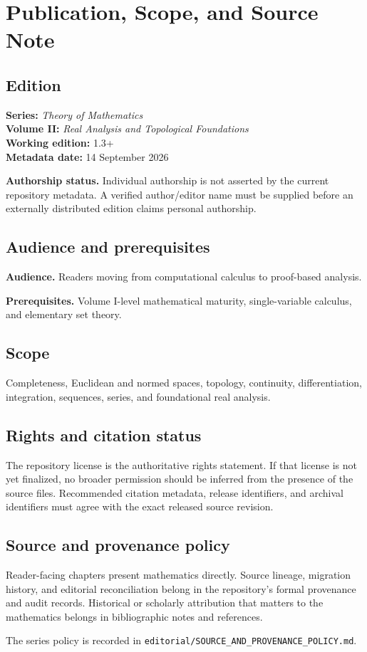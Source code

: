 \chapter*{Publication, Scope, and Source Note}
{}

\section*{Edition}
\textbf{Series:} \emph{Theory of Mathematics}\\
\textbf{Volume II:} \emph{Real Analysis and Topological Foundations}\\
\textbf{Working edition:} 1.3+\\
\textbf{Metadata date:} 14 September 2026

\textbf{Authorship status.} Individual authorship is not asserted by the current repository metadata. A verified author/editor name must be supplied before an externally distributed edition claims personal authorship.

\section*{Audience and prerequisites}
\textbf{Audience.} Readers moving from computational calculus to proof-based analysis.

\textbf{Prerequisites.} Volume I-level mathematical maturity, single-variable calculus, and elementary set theory.

\section*{Scope}
Completeness, Euclidean and normed spaces, topology, continuity, differentiation, integration, sequences, series, and foundational real analysis.

\section*{Rights and citation status}
The repository license is the authoritative rights statement. If that license is
not yet finalized, no broader permission should be inferred from the presence of
the source files. Recommended citation metadata, release identifiers, and
archival identifiers must agree with the exact released source revision.

\section*{Source and provenance policy}
Reader-facing chapters present mathematics directly. Source lineage, migration
history, and editorial reconciliation belong in the repository's formal
provenance and audit records. Historical or scholarly attribution that matters
to the mathematics belongs in bibliographic notes and references.

The series policy is recorded in
\texttt{editorial/SOURCE\_AND\_PROVENANCE\_POLICY.md}.
